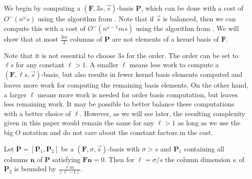 We begin by computing a $\left(\mathbf{F},3s,\vec{s}\right)$-basis
$\mathbf{P}$, which can be done with a cost of $O^{\sim}\left(n^{\omega}s\right)$
using the algorithm from \citet{Giorgi2003}. Note that if $\vec{s}$
is balanced, then we can compute this with a cost of $O^{\sim}\left(n^{\omega-1}ms\right)$
using the algorithm from . We will show
that at most %
$\frac{3m}{2}$ columns of \textbf{$\mathbf{P}$} are not elements
of a kernel basis of $\mathbf{F}$. 
\begin{rem}
Note that it is not essential to choose $3s$ for the order. The order
can be set to $\ell s$ for any constant $\ell>1$. A smaller $\ell$
means less work to compute a $(\mathbf{F},\ell s,\vec{s})$-basis,
but also results in fewer kernel basis elements computed and leaves
more work for computing the remaining basis elements. On the other
hand, a larger $\ell$ means more work is needed for order basis computation,
but leaves less remaining work. It may be possible to better balance
these computations with a better choice of $\ell$. However, as we
will see later, the resulting complexity given in this paper would
remain the same for any $\ell>1$ as long as we use the big $O$ notation
and do not care about the constant factors in the cost. \end{rem}
\begin{thm}
\label{thm:dimensionOfPartialNullspaceBasisBasedOnOrder} Let $\mathbf{P}=[\mathbf{P}_{1},\mathbf{P}_{2}]$
be a $(\mathbf{F},\sigma,\vec{s})$-basis with $\sigma>s$ and $\mathbf{P}_{1}$
containing all columns $\mathbf{n}$ of $\mathbf{P}$ satisfying $\mathbf{F}\mathbf{n}=0$.
Then for $\ell=\sigma/s$ the column dimension $\kappa$ of $\mathbf{P}_{2}$
is bounded by $\frac{\ell m}{(\ell-1)}.$ \end{thm}
